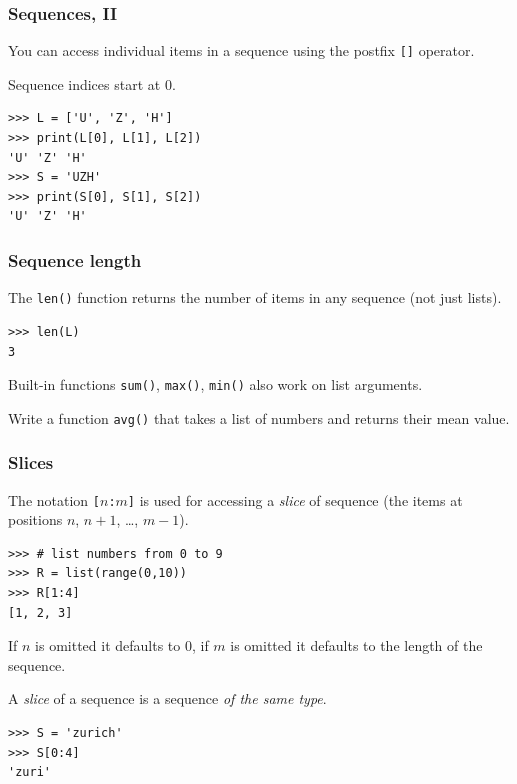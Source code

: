 \documentclass[english,serif,mathserif,xcolor=pdftex,dvipsnames,table]{beamer}
\begin{document}
\begin{frame}
  \frametitle{Sequences, II}
  You can access individual items in a sequence using the postfix
  \texttt{[]} operator.

  \+
  Sequence indices start at 0.

\begin{lstlisting}
>>> L = ['U', 'Z', 'H']
>>> print(L[0], L[1], L[2])
'U' 'Z' 'H'
>>> S = 'UZH'
>>> print(S[0], S[1], S[2])
'U' 'Z' 'H'
\end{lstlisting}
\end{frame}


\begin{frame}[fragile]
  \frametitle{Sequence length}
The \texttt{len()} function returns the number of items in any
  sequence (not just lists).
\begin{lstlisting}
>>> len(L)
3
\end{lstlisting}

  \+ Built-in functions \lstinline|sum()|, \lstinline|max()|, \lstinline|min()|
  also work on list arguments.
\end{frame}


\begin{frame}
  \begin{exercise*}[6]
    Write a function \texttt{avg()} that takes a list of numbers and returns
    their mean value.
  \end{exercise*}
\end{frame}


\begin{frame}[fragile]
  \frametitle{Slices}
  The notation \texttt{[$n$:$m$]} is used for accessing a \emph{slice}
  of sequence (the items at positions $n$, $n+1$, \ldots, $m-1$).

\begin{lstlisting}
>>> # list numbers from 0 to 9
>>> R = list(range(0,10))
>>> R[1:4]
[1, 2, 3]
\end{lstlisting}

  \+
  If $n$ is omitted it defaults to 0, if $m$ is omitted it defaults to
  the length of the sequence.

  \+ A \textit{slice} of a sequence is a sequence \textit{of the same
  type}.
\begin{lstlisting}
>>> S = 'zurich'
>>> S[0:4]
'zuri'
\end{lstlisting}
\end{frame}
\end{document}
